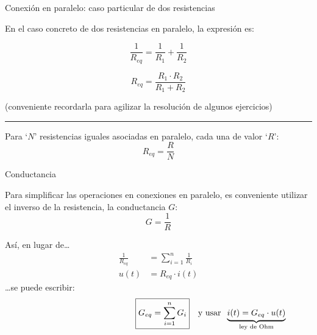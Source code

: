 \documentclass[aspectratio=169, xcolor={usenames,svgnames,dvipsnames}]{beamer}
\begin{document}

\begin{frame}{Conexión en paralelo: \hspace{3mm} caso particular de dos resistencias}  \label{diapo:2R_paralelo}

    \vspace{5mm}
    En el caso concreto de \alert{dos resistencias en paralelo}, la expresión es:
    
    \begin{equation*}
      \frac{1}{R_{eq}} = \frac{1}{R_1} + \frac{1}{R_2}
    \end{equation*}
    
    \begin{equation*}
      \boxed{R_{eq} = \frac{R_1 \cdot R_2}{R_1 + R_2}}
    \end{equation*}
    
    \centering \small{(conveniente recordarla para agilizar la resolución de algunos ejercicios)}

    \vspace{2mm}
    
    \noindent\rule{\textwidth}{0.5pt}

    \vspace{2mm}

    Para `$N$' \alert{resistencias iguales} asociadas en paralelo, cada una de valor `$R$': 
    \[
        R_{eq} = \frac{R}{N}
    \]
\end{frame}


\begin{frame}{Conductancia}

    \vspace{4mm}
    Para \alert{simplificar las operaciones} en conexiones en paralelo, es conveniente utilizar el inverso de la resistencia, la \alert{conductancia} $G$:
    \vspace{2mm}
    \begin{equation*}
      G = \frac{1}{R}
    \end{equation*}
    
    Así, en lugar de\ldots{}
    \vspace{-2mm}
    \begin{align*}
      \frac{1}{R_{eq}} &= \sum_{i = 1}^n \frac{1}{R_i}\\[7pt]
      u(t) &= R_{eq} \cdot i(t)
    \end{align*}
    \ldots{}se puede escribir:
    \begin{equation*}
      \hspace{43mm} \boxed{G_{eq} = \sum_{i = 1}^n G_i} \quad \textrm{y usar} \;\; \underbrace{i(t) = G_{eq} \cdot u(t)}_{\text{ley de Ohm}}
    \end{equation*}
\end{frame}
\end{document}
